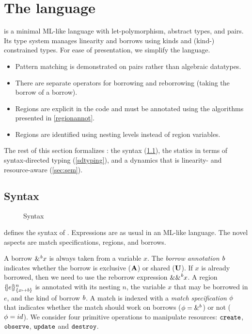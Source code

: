 \section{The \lang language}

\lang is a minimal ML-like language with
let-polymorphism, abstract types, and pairs. Its type system manages
linearity and borrows using kinds and (kind-) constrained types.
For ease of presentation, we simplify the language.
\begin{itemize}
\item Pattern matching is demonstrated on pairs rather than algebraic
  datatypes.
\item There are separate operators for borrowing and reborrowing (taking
  the borrow of a borrow).
\item Regions are explicit in the code and must be annotated using the
  algorithms presented in \cref{regionannot}.
\item Regions are identified using nesting levels instead of region
  variables.
\end{itemize}

The rest of this section formalizes  \lang: the syntax (\cref{syntax}),
the statics in terms of syntax-directed typing (\cref{sdtyping}),
and a dynamics that is linearity- and resource-aware (\cref{sec:sem}).

\subsection{Syntax}
\label{syntax}

\begin{figure}[!tb]
  
  \caption{Syntax}
  \label{grammar}
\end{figure}


 defines the syntax of \lang. Expressions are as usual
in an ML-like language.  The novel aspects are match
specifications, regions, and borrows.

A borrow $\borrow{x}$ is always taken from a variable $x$. The
\emph{borrow annotation} $\BORROW$ indicates whether the borrow is exclusive
($\MBORROW$) or shared ($\IBORROW$). If $x$ is already borrowed,
then we need to use the reborrow expression $\reborrow{x}$.
%
A region $\region{\Sone x\BORROW}{e}$ is annotated with its nesting $n$, the variable $x$ that may be borrowed in $e$, and the kind of borrow $\BORROW$.
%
A match is indexed with a \emph{match specification} $\etransfm$ that indicates
whether the match should work on borrows ($\etransfm=\&^b$) or not ($\etransfm=id$).
%
We consider four primitive operations to manipulate resources:
$\create$, $\observe$, $\update$ and $\destroy$.

